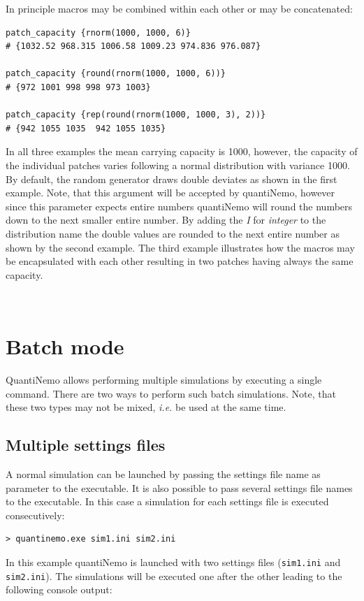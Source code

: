 \documentclass[letterpaper,12pt,oneside]{book}
\begin{document}
In principle macros may be combined within each other or may be concatenated:
\begin{lstlisting}[frame=single]
patch_capacity {rnorm(1000, 1000, 6)}
# {1032.52 968.315 1006.58 1009.23 974.836 976.087}

patch_capacity {round(rnorm(1000, 1000, 6))}
# {972 1001 998 998 973 1003}

patch_capacity {rep(round(rnorm(1000, 1000, 3), 2))}
# {942 1055 1035  942 1055 1035}
\end{lstlisting}
In all three examples the mean carrying capacity is 1000, however, the capacity of the individual patches varies following a normal distribution with variance 1000. By default, the random generator draws double deviates as shown in the first example. Note, that this argument will be accepted by quantiNemo, however since this parameter expects entire numbers quantiNemo will round the numbers down to the next smaller entire number. By adding the \textit{I} for \textit{integer} to the distribution name the double values are rounded to the next entire number as shown by the second example. The third example illustrates how the macros may be encapsulated with each other resulting in two patches having always the same capacity.


\


\section{Batch mode}\label{batchMode}
QuantiNemo allows performing multiple simulations by executing a single command. There are two ways to perform such batch simulations. Note, that these two types may not be mixed, \textit{i.e.} be used at the same time.

\subsection{Multiple settings files}\label{multiFiles}
A normal simulation can be launched by passing the settings file name as parameter to the executable. It is also possible to pass several settings file names to the executable. In this case a simulation for each settings file is executed consecutively: 
\begin{lstlisting}[frame=single]
> quantinemo.exe sim1.ini sim2.ini
\end{lstlisting}
In this example quantiNemo is launched with two settings files (\texttt{sim1.ini} and \texttt{sim2.ini}). The simulations will be executed one after the other leading to the following console output:
\end{document}
